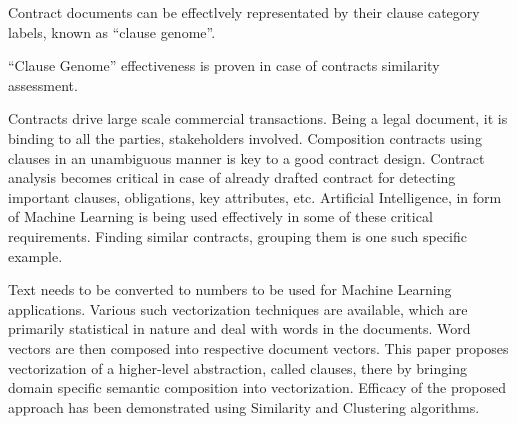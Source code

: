 \documentclass[english]{uspatent}
\begin{document}

Contract documents can be effectlvely representated by their clause category labels, known as ``clause genome''.


``Clause Genome'' effectiveness is proven in case of contracts similarity assessment.

\patentClaimsEnd


Contracts drive large scale commercial transactions. Being a legal document, it is binding to all the parties, stakeholders involved. Composition contracts using clauses in an unambiguous manner is key to a good contract design. Contract analysis becomes critical in case of already drafted contract for detecting important clauses, obligations, key attributes, etc. Artificial Intelligence, in form of Machine Learning is being used effectively in some of these critical requirements. Finding similar contracts, grouping them is one such specific example.

Text needs to be converted to numbers to be used for Machine Learning applications. Various such vectorization techniques are available, which are primarily statistical in nature and deal with words in the documents. Word vectors are then composed into respective document vectors. This paper proposes vectorization of a higher-level abstraction, called clauses, there by bringing domain specific semantic composition into vectorization. Efficacy of the proposed approach has been demonstrated using Similarity and Clustering algorithms.

\patentDrawings



\end{document}
